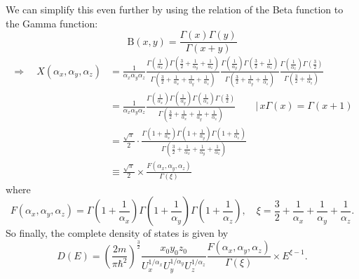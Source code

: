 We can simplify this even further by using the relation of the Beta function to the Gamma function:
\begin{equation*}
    \text{B}(x,y) = \frac{\Gamma(x)\Gamma(y)}{\Gamma(x + y)}
\end{equation*}
\begin{align*}
    \Rightarrow \quad X(\alpha_x,\alpha_y,\alpha_z) &= \frac{1}{\alpha_x \alpha_y \alpha_z} \frac{\Gamma\!\left(\frac{1}{\alpha_x}\right) \Gamma\!\left(\frac{3}{2} + \frac{1}{\alpha_y} + \frac{1}{\alpha_z}\right)}{\Gamma\!\left(\frac{3}{2} + \frac{1}{\alpha_x} + \frac{1}{\alpha_y} + \frac{1}{\alpha_z}\right)} \frac{\Gamma\!\left(\frac{1}{\alpha_y}\right) \Gamma\!\left(\frac{3}{2} + \frac{1}{\alpha_z}\right)}{\Gamma\!\left(\frac{3}{2} + \frac{1}{\alpha_y} + \frac{1}{\alpha_z}\right)} \frac{\Gamma\!\left(\frac{1}{\alpha_z}\right) \Gamma\!\left(\frac{3}{2}\right)}{\Gamma\!\left(\frac{3}{2} + \frac{1}{\alpha_z}\right)} \\
    &= \frac{1}{\alpha_x \alpha_y \alpha_z} \frac{\Gamma\!\left(\frac{1}{\alpha_x}\right) \Gamma\!\left(\frac{1}{\alpha_y}\right) \Gamma\!\left(\frac{1}{\alpha_z}\right) \Gamma\!\left(\frac{3}{2}\right)}{\Gamma\!\left(\frac{3}{2} + \frac{1}{\alpha_x} + \frac{1}{\alpha_y} + \frac{1}{\alpha_z}\right)} \qquad \Big| \, x\Gamma(x) = \Gamma(x + 1) \\
    &= \frac{\sqrt{\pi}}{2}\cdot\frac{\Gamma\!\left(1 + \frac{1}{\alpha_x}\right) \Gamma\!\left(1 + \frac{1}{\alpha_y}\right) \Gamma\!\left(1 + \frac{1}{\alpha_z}\right)}{\Gamma\!\left(\frac{3}{2} + \frac{1}{\alpha_x} + \frac{1}{\alpha_y} + \frac{1}{\alpha_z}\right)} \\
    &\equiv \frac{\sqrt{\pi}}{2} \times \frac{F(\alpha_x,\alpha_y,\alpha_z)}{\Gamma(\xi)}
\end{align*}
where
\begin{equation*}
    F(\alpha_x,\alpha_y,\alpha_z) = \Gamma\!\left(1 + \frac{1}{\alpha_x}\right) \Gamma\!\left(1 + \frac{1}{\alpha_y}\right) \Gamma\!\left(1 + \frac{1}{\alpha_z}\right),
    \quad
    \xi = \frac{3}{2} + \frac{1}{\alpha_x} + \frac{1}{\alpha_y} + \frac{1}{\alpha_z}.
\end{equation*}
So finally, the complete density of states is given by
\begin{equation*}
    D(E) = \left(\frac{2m}{\pi\hbar^2}\right)^\frac{3}{2} \frac{x_0 y_0 z_0}{U_x^{1/\alpha_x} U_y^{1/\alpha_y} U_z^{1/\alpha_z}} \frac{F(\alpha_x,\alpha_y,\alpha_z)}{\Gamma(\xi)} \times E^{\xi - 1}.
\end{equation*}

